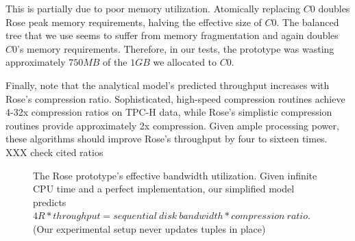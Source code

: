 \documentclass{vldb}
\newcommand{\rows}{Rose\xspace}
\newcommand{\rowss}{Rose's\xspace}
\begin{document}

This is partially due to poor memory utilization.  Atomically
replacing $C0$ doubles \rows peak memory requirements, halving the
effective size of $C0$.  The balanced tree that we use seems to suffer
from memory fragmentation and again doubles $C0$'s memory
requirements.  Therefore, in our tests, the prototype was wasting
approximately $750MB$ of the $1GB$ we allocated to $C0$.

Finally, note that the analytical model's predicted throughput
increases with \rowss compression ratio.  Sophisticated, high-speed
compression routines achieve 4-32x compression ratios on TPC-H data,
while \rowss simplistic compression routines provide approximately 2x
compression.  Given ample processing power, these algorithms should
improve \rowss throughput by four to sixteen times.  XXX check cited ratios


\begin{figure}
\centering
{}
\caption{The \rows prototype's effective bandwidth utilization.  Given
  infinite CPU time and a perfect implementation, our simplified model predicts $4R * throughput = sequential~disk~bandwidth *
  compression~ratio$.  (Our experimental setup never updates tuples in
  place)}
\label{fig:4R}
\end{figure}
\end{document}
